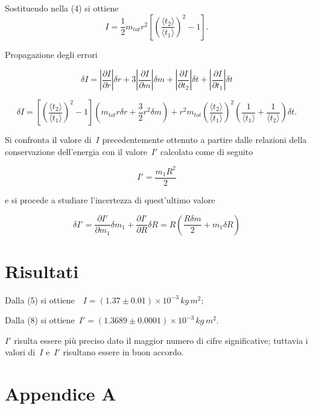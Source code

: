 \documentclass[10pt,a4paper]{article}
\begin{document}
Sostituendo nella (4) si ottiene\[I=\frac{1}{2}m_{tot} r^2\left[\left(\frac{\langle{t_2}\rangle}{\langle{t_1}\rangle}\right)^2-1\right].\]

Propagazione degli errori

\[\delta I = \left | \frac{\partial I}{\partial r} \right |\delta r + 3 \left | \frac{\partial I}{\partial m} \right | \delta m + \left | \frac{\partial I}{\partial t_2} \right | \delta t + \left | \frac{\partial I}{\partial t_1} \right |\delta t\]

\[\delta I = \left [ \left ( \frac{\langle t_2 \rangle}{\langle t_1 \rangle} \right) ^2 -1 \right] \left (m_{tot} r \delta r + \frac{3}{2} r^2 \delta m \right) + r^2 m_{tot} \left ( \frac{\langle t_2 \rangle}{\langle t_1 \rangle} \right) ^2 \left ( \frac{1}{\langle t_1 \rangle} +  \frac{1}{\langle t_2 \rangle} \right) \delta t.\]

Si confronta il valore di~\emph{\(I\)} precedentemente
ottenuto a partire dalle relazioni della conservazione dell'energia con
il valore~\(I'\) calcolato come di seguito~

\[I'=\frac{m_1R^2}{2}\]

e si procede a studiare l'incertezza di quest'ultimo valore

\[\delta I' = \frac{\partial I'}{\partial m_1} \delta m_1 + \frac{\partial I'}{\partial R} \delta R=R \left ( \frac{R \delta m}{2} + m_1 \delta R \right )\]

\section*{Risultati}

{\label{420816}}

Dalla (5) si ottiene~~\(I=(1.37 \pm 0.01) \times 10^{-3}\,kg\,m^2;\)

Dalla (8) si ottiene~\(I'=(1.3689 \pm 0.0001) \times 10^{-3} \,kg\,m^2.\)

\(I'\) risulta essere più preciso dato il maggior numero di
cifre significative; tuttavia i valori di~\(I\)
e~\(I'\) risultano essere in buon accordo.

\section*{Appendice A}

{\label{501222}}
\end{document}
